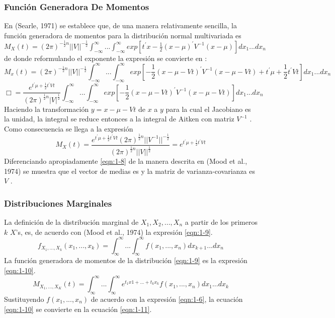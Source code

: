 \subsubsection{Función Generadora De Momentos}
En (Searle, 1971) se establece que, de una manera relativamente sencilla,  la función generadora de momentos para la distribución normal multivariada es  $M_X(t)=(2\pi)^{-\frac{1}{2}n}||V||^{-\frac{1}{2}}\int^{\infty}_{-\infty}...\int^{\infty}_{-\infty}exp[t^{\prime}x-\frac{1}{2}(x-\mu)^\prime V^{-1}(x-\mu)]dx_1...dx_n$de donde reformulando el exponente la expresión se convierte en : 
\begin{equation*}
    M_x(t)=(2\pi)^{-\frac{1}{2}n}||V||^{-\frac{1}{2}}\int^{\infty}_{-\infty}...\int^{\infty}_{-\infty}exp[-\frac{1}{2}(x-\mu-Vt)^{\prime}V^{-1}(x-\mu-Vt)+t^{\prime}\mu+\frac{1}{2}t^{\prime}Vt]dx_1...dx_n
\end{equation*}
\begin{equation*}
    \Box=\frac{e^{t^{\prime}\mu+\frac{1}{2}t^{\prime}Vt}}{(2\pi)^{\frac{1}{2}n}|V|^{\frac{1}{2}}}\int^{\infty}_{-\infty}...\int^{\infty}_{-\infty}exp[-\frac{1}{2}(x-\mu-Vt)^{\prime}V^{-1}(x-\mu-Vt)]dx_1...dx_n
\end{equation*}
Haciendo la transformación  $y=x-\mu-Vt$ de $x$  a $y$  para la cual el Jacobiano es la unidad, la integral se reduce entonces a la integral de Aitken con matriz $V^{-1}$ . Como consecuencia se llega a la expresión
\begin{equation}
    M_X(t)=\frac{e^{t^\prime\mu+\frac{1}{2}t^\prime Vt}(2\pi)^{\frac{1}{2}n}||V^{-1}||^{-\frac{1}{2}}}{(2\pi)^{\frac{1}{2}n}||V||^{\frac{1}{2}}}=e^{t^\prime\mu+\frac{1}{2}t^\prime Vt}
    \label{eqn:1-8}
\end{equation}
Diferenciando apropiadamente \ref{eqn:1-8} de la manera descrita en (Mood et al., 1974) se muestra que el vector de medias es   y la matriz de varianza-covarianza es $V$ .
\subsubsection{Distribuciones Marginales}
La definición de la distribución marginal de  $X_1,X_2,...,X_n$ a partir de los primeros $k$ $X$’s, es, de acuerdo con (Mood et al., 1974) la expresión \ref{eqn:1-9}.
\begin{equation}
    f_{X_1,...,X_k}(x_1,...,x_k)=\int^{\infty}_{\infty}...\int^{\infty}_{\infty}f(x_1,...,x_n)dx_{k+1}...dx_n
    \label{eqn:1-9}
\end{equation}
La función generadora de momentos de la  distribución \ref{eqn:1-9} es la expresión \ref{eqn:1-10}.
\begin{equation}
    M_{X_1,...,X_K}(t)=\int^{\infty}_{\infty}...\int^{\infty}_{\infty}e^{t_1x1+...+t_kx_k}f(x_1,...,x_n)dx_1...dx_k
    \label{eqn:1-10}
\end{equation}
Sustituyendo  $f(x_1,...,x_n)$  de acuerdo con la expresión \ref{eqn:1-6}, la ecuación \ref{eqn:1-10} se convierte en la ecuación \ref{eqn:1-11}.

